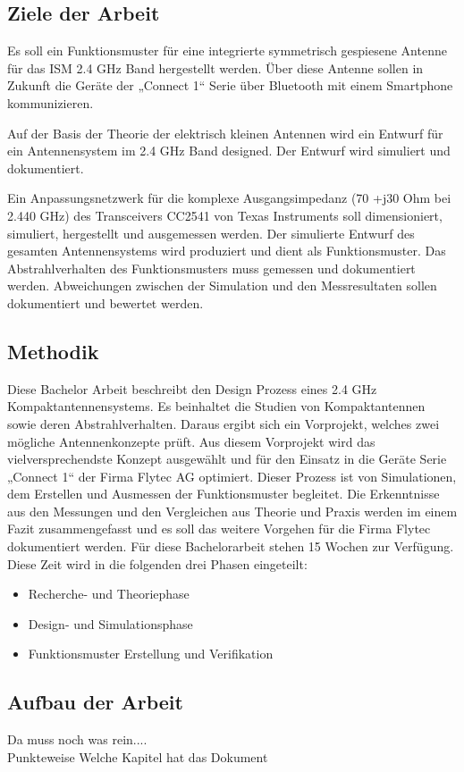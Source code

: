 \subsection{Ziele der Arbeit}
Es soll ein Funktionsmuster für eine integrierte symmetrisch gespiesene Antenne für das ISM 2.4 GHz Band hergestellt werden. Über diese Antenne sollen in Zukunft die Geräte der „Connect 1“ Serie über Bluetooth mit einem Smartphone kommunizieren. 

Auf der Basis der Theorie der elektrisch kleinen Antennen wird ein Entwurf für ein Antennensystem im 2.4 GHz Band designed. Der Entwurf wird simuliert und dokumentiert. 

Ein Anpassungsnetzwerk  für die komplexe Ausgangsimpedanz (70 +j30 Ohm bei 2.440 GHz) des Transceivers CC2541 von Texas Instruments soll dimensioniert, simuliert, hergestellt und ausgemessen werden.
Der simulierte Entwurf des gesamten Antennensystems wird produziert und dient als Funktionsmuster. Das Abstrahlverhalten des Funktionsmusters muss gemessen und dokumentiert werden.
Abweichungen zwischen der Simulation und den Messresultaten sollen dokumentiert und bewertet werden.
\subsection{Methodik}
Diese Bachelor Arbeit beschreibt den Design Prozess eines 2.4 GHz Kompaktantennensystems. Es beinhaltet die Studien von Kompaktantennen sowie deren Abstrahlverhalten. Daraus ergibt sich ein  Vorprojekt, welches zwei mögliche Antennenkonzepte prüft. Aus diesem Vorprojekt wird das vielversprechendste Konzept ausgewählt und für den Einsatz in die Geräte Serie „Connect 1“ der Firma Flytec AG optimiert. Dieser Prozess ist von Simulationen, dem  Erstellen und Ausmessen der Funktionsmuster begleitet. Die Erkenntnisse aus den Messungen und den Vergleichen aus Theorie und Praxis werden im einem Fazit zusammengefasst und es soll das weitere Vorgehen für die Firma Flytec dokumentiert werden. Für diese Bachelorarbeit stehen 15 Wochen zur Verfügung. Diese Zeit wird in die folgenden drei Phasen eingeteilt:
\begin{itemize}
	\item Recherche- und Theoriephase
	\item Design- und Simulationsphase 
	\item Funktionsmuster Erstellung und Verifikation
\end{itemize}

\subsection{Aufbau der Arbeit}
Da muss noch was rein....\\
Punkteweise Welche Kapitel hat das Dokument


